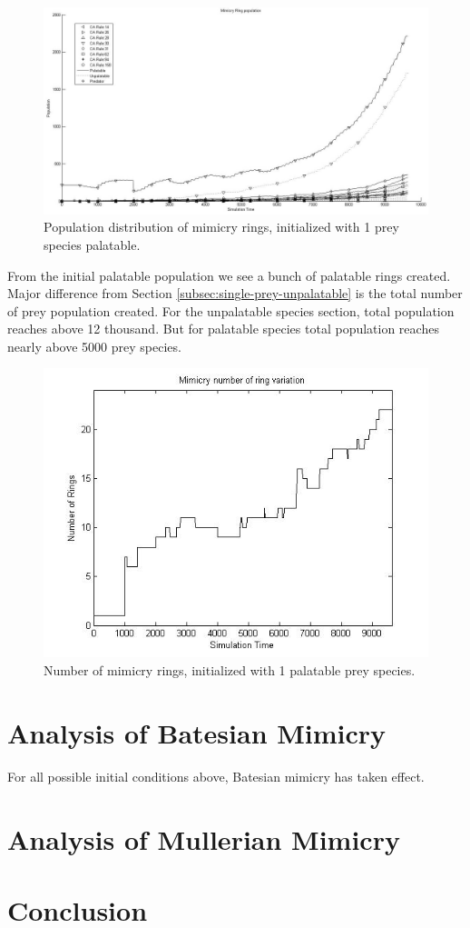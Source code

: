\begin{figure}[H]
	\centering
	\includegraphics[scale=0.40]{images/simTime9k-1-p}
	\caption{Population distribution of mimicry rings, initialized with 1 prey species palatable.}
	\label{fig:plot-1-prey-p}
\end{figure}

From the initial palatable population we see a bunch of palatable rings created. Major difference from Section \ref{subsec:single-prey-unpalatable} is the total number of prey population created. For the unpalatable species section, total population reaches above 12 thousand. But for palatable species total population reaches nearly above 5000 prey species.

\begin{figure}[H]
	\centering
	\includegraphics[scale=0.50]{images/ringSize8k-1Prey-p}
	\caption{Number of mimicry rings, initialized with 1 palatable prey species.}
	\label{fig:ringSize8k-1-Prey-p}
\end{figure}

\section{Analysis of Batesian Mimicry}
For all possible initial conditions above, Batesian mimicry has taken effect. 


\section{Analysis of Mullerian Mimicry}


\section{Conclusion}